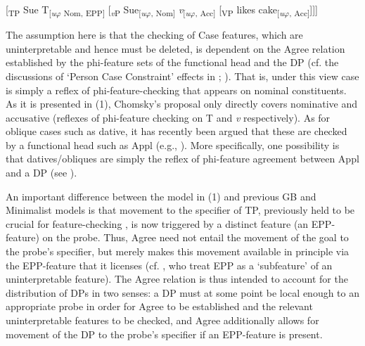 \documentclass[output=paper]{langsci/langscibook}
\begin{document}
\ea%
    \label{ex:intro:1}
[\textsubscript{TP} Sue T\textsubscript{[}\textit{\textsubscript{u}}\textsubscript{$\varphi $ Nom, EPP]} [\textit{\textsubscript{v}}\textsubscript{P} Sue\textsubscript{[}\textit{\textsubscript{u}}\textsubscript{$\varphi $, Nom]} \textit{v}\textsubscript{[}\textit{\textsubscript{u}}\textsubscript{$\varphi $, Acc]} [\textsubscript{VP} likes cake\textsubscript{[}\textit{\textsubscript{u}}\textsubscript{$\varphi $, Acc]}]]]
    \z
 

 

The assumption here is that the checking of Case features, which are uninterpretable and hence must be deleted, is dependent on the Agree relation established by the phi-feature sets of the functional head and the DP (cf. the discussions of ‘Person Case Constraint’ effects in \citealt{Anagnostopoulou2003}; \citealt{Rezac2008}). That is, under this view case is simply a reflex of phi-feature-checking that appears on nominal constituents. As it is presented in (1), Chomsky’s proposal only directly covers nominative and accusative (reflexes of phi-feature checking on T and \textit{v} respectively). As for oblique cases such as dative, it has recently been argued that these are checked by a functional head such as Appl (e.g., \citealt{Cuervo2003,Pylkkaenen2008}). More specifically, one possibility is that datives/obliques are simply the reflex of phi-feature agreement between Appl and a DP (see \citealt{Marchis2017}).

An important difference between the model in (1) and previous GB and Minimalist models is that movement to the specifier of TP, previously held to be crucial for feature-checking \citep{Chomsky1995}, is now triggered by a distinct feature (an EPP-feature) on the probe. Thus, Agree need not entail the movement of the goal to the probe’s specifier, but merely makes this movement available in principle via the EPP-feature that it licenses (cf. \citealt{Pesetsky2001}, who treat EPP as a ‘subfeature’ of an uninterpretable feature). The Agree relation is thus intended to account for the distribution of DPs in two senses: a DP must at some point be local enough to an appropriate probe in order for Agree to be established and the relevant uninterpretable features to be checked, and Agree additionally allows for movement of the DP to the probe’s specifier if an EPP-feature is present.
\end{document}
